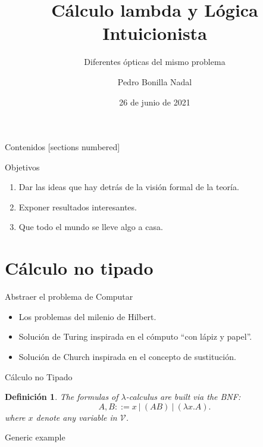 \documentclass[usenames,dvipsnames]{beamer}
\title{Cálculo lambda y Lógica Intuicionista}
\subtitle{Diferentes ópticas del mismo problema}
\date{26 de junio de 2021}
\institute{EsLibre 2021}
\author{Pedro Bonilla Nadal}
\newtheorem{definicion}{Definición}
\begin{document}
\maketitle
\begin{frame}{Contenidos}
  [sections numbered]
  \tableofcontents [hideallsubsections]
\end{frame}
\begin{frame}{Objetivos}
  \begin{enumerate}
  \item Dar las ideas que hay detrás de la visión formal de la teoría.
  \item Exponer resultados interesantes.
  \item Que todo el mundo se lleve algo a casa.
  \end{enumerate}
\end{frame}
\section{Cálculo no tipado}
\begin{frame}{Abstraer el problema de Computar}
  \begin{itemize}
  \item Los problemas del milenio de Hilbert.
  \item Solución de Turing inspirada en el cómputo ``con lápiz y papel''.
  \item Solución de Church inspirada en el concepto de sustitución.
  \end{itemize}
\end{frame}

\begin{frame}{Cálculo no Tipado}
\begin{definicion}
  The formulas of  $\lambda$-calculus are built via the BNF:
  $$A,B ::= x\ |\ (AB)\ |\ (\lambda x.A) .$$
  where $x$ denote any variable in $\mathcal{V}$.
\end{definicion}

\begin{example}
  Generic example
\end{example}

\end{frame}
\end{document}
